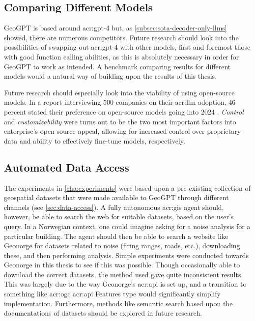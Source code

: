 \subsection{Comparing Different Models}
\label{subsec:comparing-different-models}

GeoGPT is based around \acrshort{acr:gpt}-4 but, as \autoref{subsec:sota-decoder-only-llms} showed, there are numerous competitors. Future research should look into the possibilities of swapping out \acrshort{acr:gpt}-4 with other models, first and foremost those with good function calling abilities, as this is absolutely necessary in order for GeoGPT to work as intended. A benchmark comparing results for different models would a natural way of building upon the results of this thesis.

Future research should especially look into the viability of using open-source models. In a report interviewing 500 companies on their \acrshort{acr:llm} adoption, 46 percent stated their preference on open-source models going into 2024 \citep{wangsarah16ChangesWay2024}. \textit{Control} and \textit{customizability} were turns out to be the two most important factors into enterprise's open-source appeal, allowing for increased control over proprietary data and ability to effectively fine-tune models, respectively.

\subsection{Automated Data Access}
\label{subsec:automated-data-access}

The experiments in \autoref{cha:experiments} were based upon a pre-existing collection of geospatial datasets that were made available to GeoGPT through different channels (see \autoref{sec:data-access}). A fully autonomous \acrshort{acr:gis} agent should, however, be able to search the web for suitable datasets, based on the user's query. In a Norwegian context, one could imagine asking for a noise analysis for a particular building. The agent should then be able to search a website like Geonorge for datasets related to noise (firing ranges, roads, etc.), downloading these, and then performing analysis. Simple experiments were conducted towards Geonorge in this thesis to see if this was possible. Though occasionally able to download the correct datasets, the method used gave quite inconsistent results.  This was largely due to the way Geonorge's \acrshort{acr:api} is set up, and a transition to something like \acrshort{acr:ogc} \acrshort{acr:api} Features type  would significantly simplify implementation. Furthermore, methods like semantic search based upon the documentations of datasets should be explored in future research.